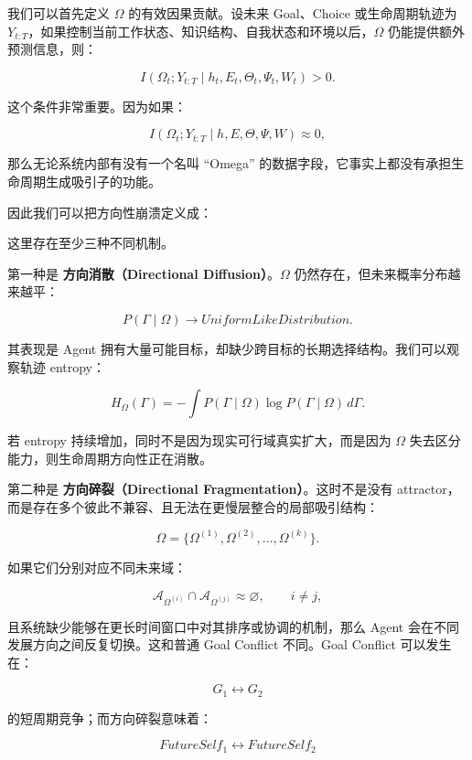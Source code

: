 我们可以首先定义 $\Omega$ 的有效因果贡献。设未来 Goal、Choice 或生命周期轨迹为 $Y_{t:T}$，如果控制当前工作状态、知识结构、自我状态和环境以后，$\Omega$ 仍能提供额外预测信息，则：

\[
I
\left(
\Omega_t;
Y_{t:T}
\mid
h_t,E_t,\Theta_t,\Psi_t,W_t
\right)
>0.
\]

这个条件非常重要。因为如果：

\[
I
\left(
\Omega_t;
Y_{t:T}
\mid
h,E,\Theta,\Psi,W
\right)
\approx0,
\]

那么无论系统内部有没有一个名叫 ``Omega'' 的数据字段，它事实上都没有承担生命周期生成吸引子的功能。

因此我们可以把方向性崩溃定义成：

\begin{statementbox}
\centering
{}
\end{statementbox}

这里存在至少三种不同机制。

第一种是 \textbf{方向消散（Directional Diffusion）}。$\Omega$ 仍然存在，但未来概率分布越来越平：

\[
P(\Gamma\mid\Omega)
\rightarrow
UniformLikeDistribution.
\]

其表现是 Agent 拥有大量可能目标，却缺少跨目标的长期选择结构。我们可以观察轨迹 entropy：

\[
H_{\Omega}(\Gamma)
=
-
\int
P(\Gamma\mid\Omega)
\log
P(\Gamma\mid\Omega)
\,d\Gamma.
\]

若 entropy 持续增加，同时不是因为现实可行域真实扩大，而是因为 $\Omega$ 失去区分能力，则生命周期方向性正在消散。

第二种是 \textbf{方向碎裂（Directional Fragmentation）}。这时不是没有 attractor，而是存在多个彼此不兼容、且无法在更慢层整合的局部吸引结构：

\[
\Omega
=
\{
\Omega^{(1)},
\Omega^{(2)},
\ldots,
\Omega^{(k)}
\}.
\]

如果它们分别对应不同未来域：

\[
\mathcal A_{\Omega^{(i)}}
\cap
\mathcal A_{\Omega^{(j)}}
\approx\varnothing,
\qquad
i\neq j,
\]

且系统缺少能够在更长时间窗口中对其排序或协调的机制，那么 Agent 会在不同发展方向之间反复切换。这和普通 Goal Conflict 不同。Goal Conflict 可以发生在：

\[
G_1\leftrightarrow G_2
\]

的短周期竞争；而方向碎裂意味着：

\[
FutureSelf_1
\leftrightarrow
FutureSelf_2
\]

